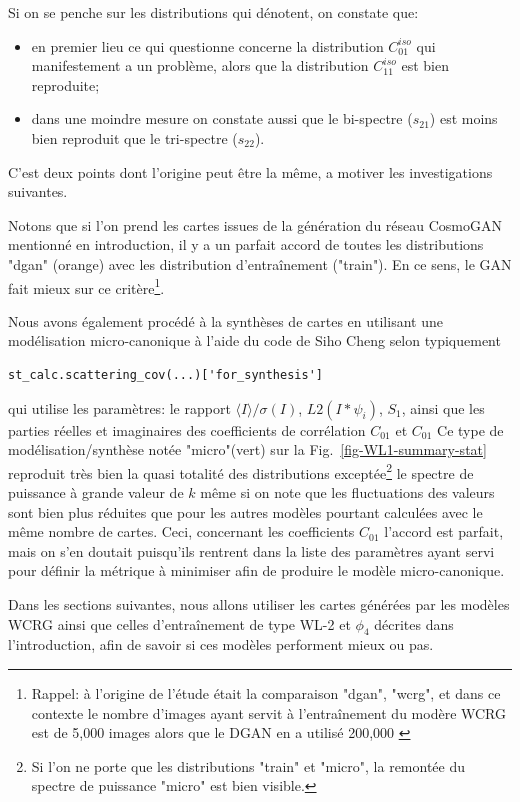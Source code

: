 \documentclass[12pt,twoside]{article}
\newcommand{\itemb}{\item[$\bullet$]}
\begin{document}
Si on se penche sur les distributions qui dénotent, on constate que:
\begin{itemize}
\itemb en premier lieu ce qui questionne concerne la distribution $C_{01}^{iso}$ qui manifestement a un problème, alors que la distribution $C_{11}^{iso}$ est bien reproduite;
\itemb dans une moindre mesure on constate aussi que le bi-spectre ($s_{21}$) est moins bien reproduit que le tri-spectre ($s_{22}$).
\end{itemize} 
C'est deux points dont l'origine peut être la même, a motiver les investigations suivantes.

Notons que si l'on prend les cartes  issues de la génération du réseau CosmoGAN mentionné en introduction, il y a un parfait accord de toutes les distributions "dgan" (orange) avec les distribution d'entraînement ("train"). En ce sens, le GAN fait mieux sur ce critère\footnote{Rappel: à l'origine de l'étude était la comparaison "dgan", "wcrg", et dans ce contexte le nombre d'images ayant servit à l'entraînement du modère WCRG est de 5,000 images alors que le DGAN en a utilisé 200,000 \citep{2019ComAC...6....1M}}.  

Nous avons également procédé à la synthèses de cartes en utilisant une modélisation micro-canonique \citep{2023arXiv230617210C} à l'aide du code de Siho Cheng selon typiquement 
\begin{lstlisting}[language=iPython]
 st_calc.scattering_cov(...)['for_synthesis']
\end{lstlisting}
qui utilise les paramètres: le rapport $\langle I\rangle/\sigma(I)$, $L2(I\ast \psi_i)$, $S_1$, ainsi que les parties réelles et imaginaires des coefficients de corrélation $C_{01}$ et $C_{01}$
Ce type de modélisation/synthèse notée "micro"(vert) sur la Fig.~\ref{fig-WL1-summary-stat} reproduit très bien la quasi totalité des distributions exceptée\footnote{Si l'on ne porte que les distributions "train" et "micro", la remontée du spectre de puissance "micro" est bien visible.} le spectre de puissance à grande valeur de $k$ même si on note que les fluctuations des valeurs sont bien plus réduites que pour les autres modèles pourtant calculées avec le même nombre de cartes. Ceci, concernant les coefficients $C_{01}$ l'accord est parfait, mais on s'en doutait puisqu'ils rentrent dans la liste des paramètres ayant servi pour définir la métrique à minimiser afin de produire le modèle micro-canonique.

Dans les sections suivantes, nous allons utiliser les cartes générées par les modèles WCRG ainsi que celles d'entraînement de type WL-2 et $\phi_4$ décrites dans l'introduction, afin de savoir si ces modèles performent mieux ou pas.
%
\end{document}

